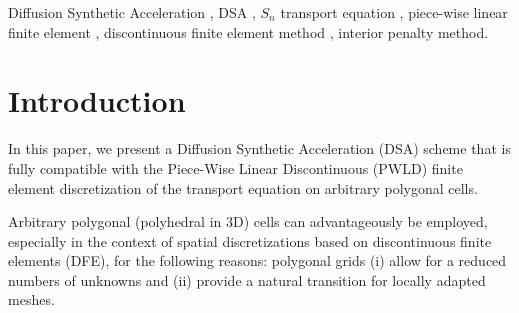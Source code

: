 \documentclass[preprint,10pt]{elsarticle}
\renewcommand{\(}{\left(}
\renewcommand{\)}{\right)}
\renewcommand{\[}{\left[}
\renewcommand{\]}{\right]}
\begin{document}
\begin{frontmatter}
\begin{keyword}
Diffusion Synthetic Acceleration \sep
DSA \sep
$S_n$ transport equation \sep
piece-wise linear finite element \sep
discontinuous finite element method \sep
interior penalty method.
\end{keyword}
\end{frontmatter}

\linenumbers
\doublespacing


\section{Introduction}

In this paper, we present a Diffusion Synthetic Acceleration (DSA) scheme
that is fully compatible with the Piece-Wise Linear Discontinuous (PWLD) finite
element discretization of the transport equation on arbitrary
polygonal cells. 

Arbitrary polygonal (polyhedral in 3D) cells can advantageously be employed, especially
in the context of spatial discretizations based on discontinuous finite elements (DFE),
for the following reasons: polygonal grids 
(i) allow for a reduced numbers of unknowns and
(ii) provide a natural transition for locally adapted meshes. 
\end{document}
